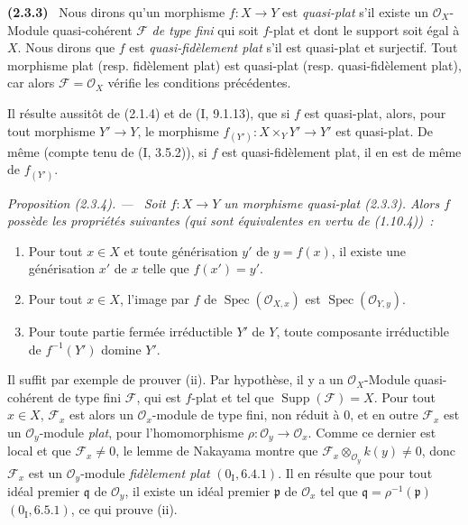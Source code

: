 \documentclass[10pt,oneside]{book}
\makeatletter
\newcommand{\oldpage}[2][]{%
  \setcounter{footnote}{0}%
  \marginpar{\scriptsize\textbf{#1}~|~#2}\ignorespaces}
\newenvironment{env}[1][]{\par\medskip\noindent\textbf{(#1)}\ }{\par}
\newenvironment{proposition}[1][]{%
  \par\medskip\noindent\itshape Proposition (#1). ---\ }{\par}
\newcommand{\EGAReaderTarget}[2]{\hypertarget{#1}{}\@bsphack\begingroup\def\@currentHref{#1}\label{#2}\endgroup\@esphack}
\makeatother
\begin{document}
\begin{env}[2.3.3]
\label{IV.2.3.3-fr}
Nous dirons qu'un morphisme $f:X\to Y$ est \emph{quasi-plat} s'il existe un
$\mathcal O_X$-Module quasi-cohérent $\mathscr F$ \emph{de type fini} qui soit
$f$-plat et dont le support soit égal à $X$. Nous dirons que $f$ est
\emph{quasi-fidèlement plat} s'il est quasi-plat et surjectif. Tout morphisme
plat (resp. fidèlement plat) est quasi-plat (resp. quasi-fidèlement plat), car
alors $\mathscr F=\mathcal O_X$ vérifie les conditions précédentes.
\end{env}

Il résulte aussitôt de (2.1.4) et de (I, 9.1.13), que si $f$ est quasi-plat,
alors, pour tout morphisme $Y'\to Y$, le morphisme
$f_{(Y')}:X\times_Y Y'\to Y'$ est quasi-plat. De même (compte tenu de
(I, 3.5.2)), si $f$ est quasi-fidèlement plat, il en est de même de
$f_{(Y')}$.

\begin{proposition}[2.3.4]
\EGAReaderTarget{ega4.c04.prop.2-3-4}{IV.2.3.4-fr}
Soit $f:X\to Y$ un morphisme quasi-plat (2.3.3). Alors $f$ possède les
propriétés suivantes (qui sont équivalentes en vertu de (1.10.4))~:
\begin{enumerate}
  \item[(i)] Pour tout $x\in X$ et toute générisation $y'$ de $y=f(x)$, il
  existe une générisation $x'$ de $x$ telle que $f(x')=y'$.
  \item[(ii)] Pour tout $x\in X$, l'image par $f$ de
  $\operatorname{Spec}(\mathcal O_{X,x})$ est
  $\operatorname{Spec}(\mathcal O_{Y,y})$.
\oldpage[IV-2]{15}
  \item[(iii)] Pour toute partie fermée irréductible $Y'$ de $Y$, toute
  composante irréductible de $f^{-1}(Y')$ domine $Y'$.
\end{enumerate}
\end{proposition}

Il suffit par exemple de prouver (ii). Par hypothèse, il y a un
$\mathcal O_X$-Module quasi-cohérent de type fini $\mathscr F$, qui est
$f$-plat et tel que $\operatorname{Supp}(\mathscr F)=X$. Pour tout $x\in X$,
$\mathscr F_x$ est alors un $\mathcal O_x$-module de type fini, non réduit à
0, et en outre $\mathscr F_x$ est un $\mathcal O_y$-module \emph{plat}, pour
l'homomorphisme $\rho:\mathcal O_y\to\mathcal O_x$. Comme ce dernier est
local et que $\mathscr F_x\neq0$, le lemme de Nakayama montre que
$\mathscr F_x\otimes_{\mathcal O_y}k(y)\neq0$, donc $\mathscr F_x$ est un
$\mathcal O_y$-module \emph{fidèlement plat} $(0_{\mathrm I},6.4.1)$. Il
en résulte que pour tout idéal premier $\mathfrak q$ de $\mathcal O_y$, il
existe un idéal premier $\mathfrak p$ de $\mathcal O_x$ tel que
$\mathfrak q=\rho^{-1}(\mathfrak p)$ $(0_{\mathrm I},6.5.1)$, ce qui
prouve (ii).
\end{document}
